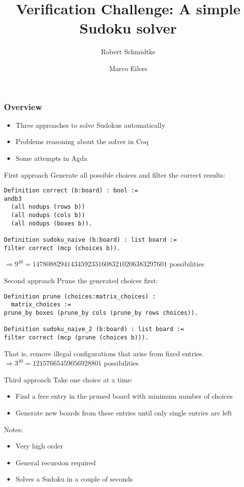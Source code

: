 \documentclass{beamer}
\title[uubeamer example presentation]{Verification Challenge: A simple Sudoku solver}
\subtitle{}
\author{Robert Schmidtke \and Marco Eilers}
\institute[Computing Science]{
Utrecht University\\
Faculty of Science\\
Department of Information and Computing Sciences}
\begin{document}

\begin{frame}
  \maketitle
\end{frame}

\begin{frame}
  \frametitle{Overview}
  \begin{itemize}
    \item Three approaches to solve Sudokus automatically
    \item Problems reasoning about the solver in Coq
    \item Some attempts in Agda
  \end{itemize}
\end{frame}


\begin{frame}[fragile]{First approach}
  Generate all possible choices and filter the correct results:
  \begin{lstlisting}
Definition correct (b:board) : bool :=
andb3
  (all nodups (rows b))
  (all nodups (cols b))
  (all nodups (boxes b)).

Definition sudoku_naive (b:board) : list board :=
filter correct (mcp (choices b)).
  \end{lstlisting}
  \(\Rightarrow 9^{40} = 147808829414345923316083210206383297601\) possibilities
\end{frame}

\begin{frame}[fragile]{Second approach}
  Prune the generated choices first:
  \begin{lstlisting}
Definition prune (choices:matrix_choices) :
  matrix_choices :=
prune_by boxes (prune_by cols (prune_by rows choices)).  

Definition sudoku_naive_2 (b:board) : list board :=
filter correct (mcp (prune (choices b))).    
  \end{lstlisting}
  That is, remove illegal configurations that arise from fixed entries.
  \(\Rightarrow 3^{40} = 12157665459056928801\) possibilities
\end{frame}

\begin{frame}{Third approach}
  Take one choice at a time:
  \begin{itemize}
    \item Find a free entry in the pruned board with minimum number of choices
    \item Generate new boards from these entries until only single entries are left
  \end{itemize}
  
  Notes:
  \begin{itemize}
    \item Very high order
    \item General recursion required
    \item Solves a Sudoku in a couple of seconds
  \end{itemize}
\end{frame}
\end{document}
